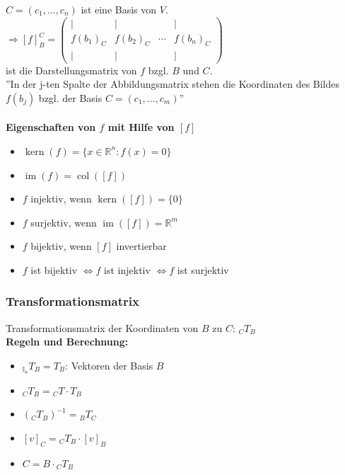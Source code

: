\documentclass[6pt,a4paper]{scrartcl}
\DeclareMathOperator{\im}{im}
\DeclareMathOperator{\col}{col}
\DeclareMathOperator{\Kern}{kern}
\begin{document}
\begin{multicols*}{4}
$C=(c_1,\dots,c_n)$ ist eine Basis von $V$. \\
$\Rightarrow [f]_B^C = \begin{pmatrix}
\vert & \vert &  & \vert \\
f(b_1)_C & f(b_2)_C & \cdots & f(b_n)_C\\
\vert & \vert &  & \vert
\end{pmatrix}$ \\
ist die Darstellungsmatrix von $f$ bzgl. $B$ und $C$. \\
''In der j-ten Spalte der Abbildungsmatrix stehen die Koordinaten des Bildes $f(b_j)$ bzgl. der Basis $C=(c_1,\dots,c_m)$'' \\ \\
\textbf{Eigenschaften von $f$ mit Hilfe von $[f]$}
\begin{itemize}\itemsep0pt
\item $\Kern(f) = \{ x\in\mathbb{R}^n : f(x) = 0 \}$
\item $\im(f) = \col([f])$
\item $f$ injektiv, wenn $\Kern([f])=\{0\}$
\item $f$ surjektiv, wenn $\im([f])=\mathbb{R}^m$
\item $f$ bijektiv, wenn $[f]$ invertierbar
\item $f$ ist bijektiv $\Leftrightarrow f$ ist injektiv $\Leftrightarrow f$ ist surjektiv
\end{itemize}
\subsubsection{Transformationsmatrix}
Transformationsmatrix der Koordinaten von $B$ zu $C$: $_CT_B$\\
\textbf{Regeln und Berechnung:}
\begin{itemize}
	\item $_{\mathbb{I}_n}T_B = T_B$: Vektoren der Basis $B$
	\item $_CT_B = {_CT} \cdot T_B$
	\item $(_CT_B)^{-1} = {_BT_C}$
	\item $[v]_C = {_CT_B}\cdot[v]_B$
	\item $C=B\cdot {_CT_B}$
\end{itemize}

\end{multicols*}
\end{document}
